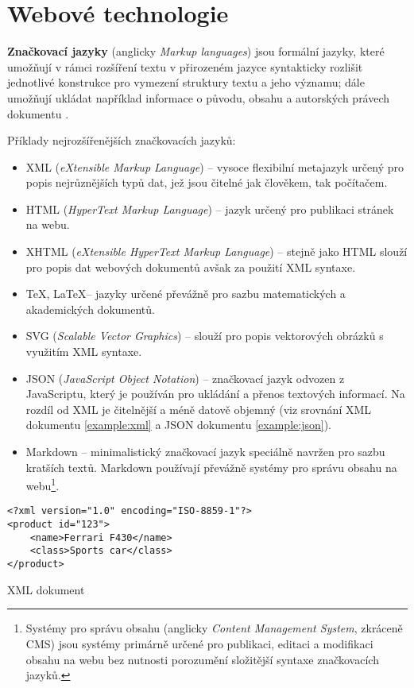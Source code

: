 \chapter{Webové technologie}
\label{chap:languages}

\textbf{Značkovací jazyky} (anglicky \textit{Markup languages}) jsou formální jazyky, které umožňují v rámci rozšíření textu v přirozeném jazyce syntakticky rozlišit jednotlivé konstrukce pro vymezení struktury textu a jeho významu; dále umožňují ukládat například informace o původu, obsahu a autorských právech dokumentu \cite{14} \cite{16}.

Příklady nejrozšířenějších značkovacích jazyků:

\begin{itemize}
    \item XML (\textit{eXtensible Markup Language}) -- vysoce flexibilní metajazyk určený pro popis nejrůznějších typů dat, jež jsou čitelné jak člověkem, tak počítačem.
    \item HTML (\textit{HyperText Markup Language}) -- jazyk určený pro publikaci stránek na webu.
    \item XHTML (\textit{eXtensible HyperText Markup Language}) -- stejně jako HTML slouží pro popis dat webových dokumentů avšak za použití XML syntaxe.
    \item \TeX, \LaTeX -- jazyky určené převážně pro sazbu matematických a akademických dokumentů.
    \item SVG (\textit{Scalable Vector Graphics}) -- slouží pro popis vektorových obrázků s využitím XML syntaxe.
    \item JSON (\textit{JavaScript Object Notation}) -- značkovací jazyk odvozen z JavaScriptu, který je používán pro ukládání a přenos textových informací. Na rozdíl od XML je čitelnější a méně datově objemný (viz srovnání XML dokumentu \ref{example:xml} a JSON dokumentu \ref{example:json}).
    \item Markdown -- minimalistický značkovací jazyk speciálně navržen pro sazbu kratších textů. Markdown používají převážně systémy pro správu obsahu na webu\footnote{Systémy pro správu obsahu (anglicky \textit{Content Management System}, zkráceně CMS) jsou systémy primárně určené pro publikaci, editaci a modifikaci obsahu na webu bez nutnosti porozumění složitější syntaxe značkovacích jazyků.}.
\end{itemize}

\begin{example}
    \centering
    \begin{lstlisting}
<?xml version="1.0" encoding="ISO-8859-1"?>
<product id="123">
    <name>Ferrari F430</name>
    <class>Sports car</class>
</product>
    \end{lstlisting}
    \caption{XML dokument}
    \label{example:xml}
\end{example}

